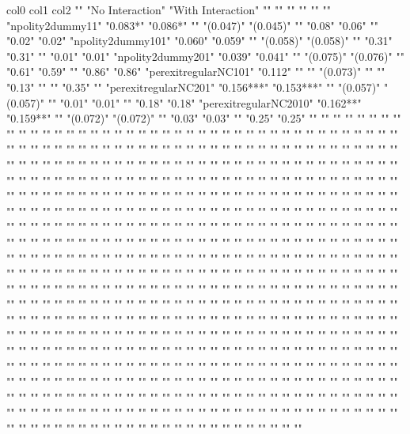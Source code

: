col0	col1	col2
""	"No Interaction"	"With Interaction"
""	""	""
""	""	""
"npolity2dummy11"	"0.083*"	"0.086*"
""	"(0.047)"	"(0.045)"
""	"0.08"	"0.06"
""	"0.02"	"0.02"
"npolity2dummy101"	"0.060"	"0.059"
""	"(0.058)"	"(0.058)"
""	"0.31"	"0.31"
""	"0.01"	"0.01"
"npolity2dummy201"	"0.039"	"0.041"
""	"(0.075)"	"(0.076)"
""	"0.61"	"0.59"
""	"0.86"	"0.86"
"perexitregularNC101"	"0.112"	""
""	"(0.073)"	""
""	"0.13"	""
""	"0.35"	""
"perexitregularNC201"	"0.156***"	"0.153***"
""	"(0.057)"	"(0.057)"
""	"0.01"	"0.01"
""	"0.18"	"0.18"
"perexitregularNC2010"	"0.162**"	"0.159**"
""	"(0.072)"	"(0.072)"
""	"0.03"	"0.03"
""	"0.25"	"0.25"
""	""	""
""	""	""
""	""	""
""	""	""
""	""	""
""	""	""
""	""	""
""	""	""
""	""	""
""	""	""
""	""	""
""	""	""
""	""	""
""	""	""
""	""	""
""	""	""
""	""	""
""	""	""
""	""	""
""	""	""
""	""	""
""	""	""
""	""	""
""	""	""
""	""	""
""	""	""
""	""	""
""	""	""
""	""	""
""	""	""
""	""	""
""	""	""
""	""	""
""	""	""
""	""	""
""	""	""
""	""	""
""	""	""
""	""	""
""	""	""
""	""	""
""	""	""
""	""	""
""	""	""
""	""	""
""	""	""
""	""	""
""	""	""
""	""	""
""	""	""
""	""	""
""	""	""
""	""	""
""	""	""
""	""	""
""	""	""
""	""	""
""	""	""
""	""	""
""	""	""
""	""	""
""	""	""
""	""	""
""	""	""
""	""	""
""	""	""
""	""	""
""	""	""
""	""	""
""	""	""
""	""	""
""	""	""
""	""	""
""	""	""
""	""	""
""	""	""
""	""	""
""	""	""
""	""	""
""	""	""
""	""	""
""	""	""
""	""	""
""	""	""
""	""	""
""	""	""
""	""	""
""	""	""
""	""	""
""	""	""
""	""	""
""	""	""
""	""	""
""	""	""
""	""	""
""	""	""
""	""	""
""	""	""
""	""	""
""	""	""
""	""	""
""	""	""
""	""	""
""	""	""
""	""	""
""	""	""
""	""	""
""	""	""
""	""	""
""	""	""
""	""	""
""	""	""
""	""	""
""	""	""
""	""	""
""	""	""
""	""	""
""	""	""
""	""	""
""	""	""
""	""	""
""	""	""
""	""	""
""	""	""
""	""	""
""	""	""
""	""	""
""	""	""
""	""	""
""	""	""
""	""	""
""	""	""
""	""	""
""	""	""
""	""	""
""	""	""
""	""	""
""	""	""
""	""	""
""	""	""
""	""	""
""	""	""
""	""	""
""	""	""
""	""	""
""	""	""
""	""	""
""	""	""
""	""	""
""	""	""
""	""	""
""	""	""
""	""	""
""	""	""
""	""	""
""	""	""
""	""	""
""	""	""
""	""	""
""	""	""
""	""	""
""	""	""
""	""	""
""	""	""
""	""	""
""	""	""
""	""	""
""	""	""
""	""	""
""	""	""
""	""	""
""	""	""
""	""	""
""	""	""
""	""	""
""	""	""
""	""	""
""	""	""
""	""	""
""	""	""
""	""	""
""	""	""
""	""	""
""	""	""
""	""	""
""	""	""
""	""	""
""	""	""
""	""	""
""	""	""
""	""	""
""	""	""
""	""	""
""	""	""
""	""	""
""	""	""
""	""	""
""	""	""
""	""	""
""	""	""
""	""	""
""	""	""
""	""	""
""	""	""
""	""	""
""	""	""
""	""	""
""	""	""
""	""	""
""	""	""
""	""	""
""	""	""
""	""	""
""	""	""
""	""	""
""	""	""
""	""	""
""	""	""
""	""	""
""	""	""
